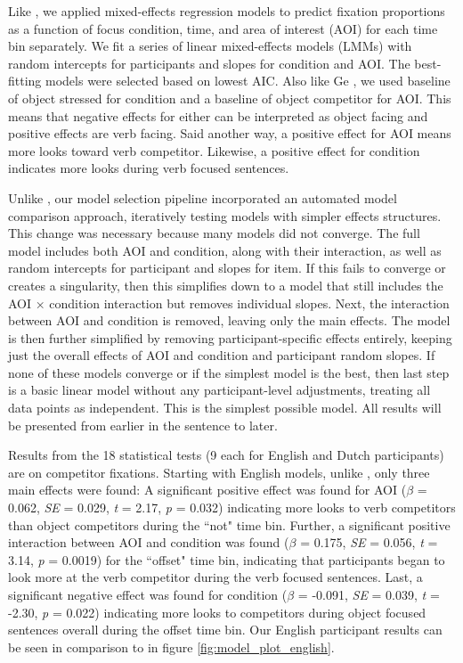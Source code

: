 Like \cite{Ge2021}, we applied mixed-effects regression models to predict fixation proportions as a function of focus condition, time, and area of interest (AOI) for each time bin separately. We fit a series of linear mixed-effects models (LMMs) with random intercepts for participants and slopes for condition and AOI. The best-fitting models were selected based on lowest AIC. Also like Ge \cite{Ge2021}, we used baseline of object stressed for condition and a baseline of object competitor for AOI. This means that negative effects for either can be interpreted as object facing and positive effects are verb facing. Said another way, a positive effect for AOI means more looks toward verb competitor. Likewise, a positive effect for condition indicates more looks during verb focused sentences.

Unlike \cite{Ge2021}, our model selection pipeline incorporated an automated model comparison approach, iteratively testing models with simpler effects structures. This change was necessary because many models did not converge. The full model includes both AOI and condition, along with their interaction, as well as random intercepts for participant and slopes for item. If this fails to converge or creates a singularity, then this simplifies down to a model that still includes the AOI × condition interaction but removes individual slopes. Next, the interaction between AOI and condition is removed, leaving only the main effects. The model is then further simplified by removing participant-specific effects entirely, keeping just the overall effects of AOI and condition and participant random slopes. If none of these models converge or if the simplest model is the best, then last step is a basic linear model without any participant-level adjustments, treating all data points as independent. This is the simplest possible model. All results will be presented from earlier in the sentence to later.

Results from the 18 statistical tests (9 each for English and Dutch participants) are on competitor fixations. Starting with English models, unlike \citep{Ge2021}, only three main effects were found: A significant positive effect was found for AOI ($\beta$ = 0.062, \textit{SE} = 0.029, \textit{t} = 2.17, \textit{p} = 0.032) indicating more looks to verb competitors than object competitors during the ``not" time bin. Further, a significant positive interaction between AOI and condition was found ($\beta$ = 0.175, \textit{SE} = 0.056, \textit{t} = 3.14, \textit{p} = 0.0019) for the ``offset" time bin, indicating that participants began to look more at the verb competitor during the verb focused sentences. Last, a significant negative effect was found for condition ($\beta$ = -0.091, \textit{SE} = 0.039, \textit{t} = -2.30, \textit{p} = 0.022) indicating more looks to competitors during object focused sentences overall during the offset time bin. Our English participant results can be seen in comparison to \cite{Ge2021} in figure \ref{fig:model_plot_english}.

